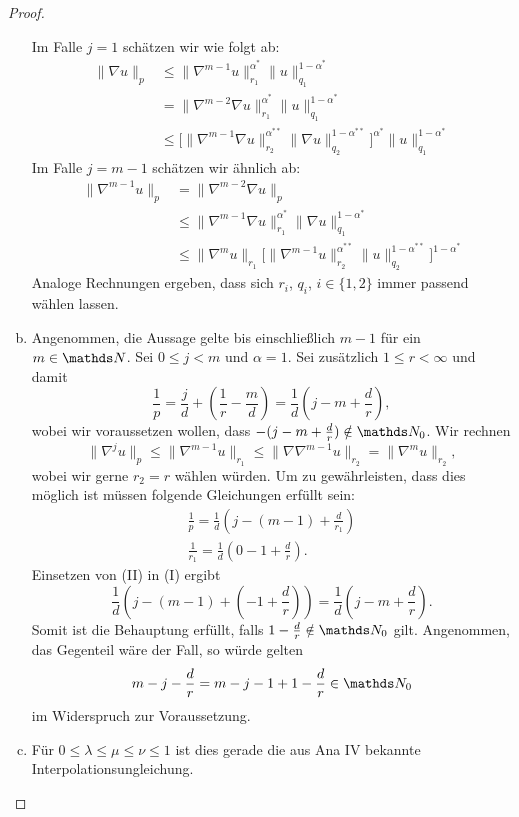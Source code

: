 \begin{proof}
\begin{enumerate}[a)]
      Im Falle $j = 1$ schätzen wir wie folgt ab:
      \begin{align*}
        \| \nabla u\|_p &\leq \|\nabla^{m - 1} u\|_{r_1}^{\alpha^*} \|u\|_{q_1}^{1 - \alpha^*} \\
        &= \|\nabla^{m - 2} \nabla u \|_{r_1}^{\alpha^*} \|u\|_{q_1}^{1 - \alpha^*} \\
        &\leq \Big[ \|\nabla^{m - 1} \nabla u\|_{r_2}^{\alpha^{**}} \|\nabla u\|_{q_2}^{1 - \alpha^{**}} \Big]^{\alpha^*} \|u\|_{q_1}^{1 - \alpha^*}
      \end{align*}
      Im Falle $j = m - 1$ schätzen wir ähnlich ab:
      \begin{align*}
        \| \nabla^{m - 1} u\|_p 
        &= \|\nabla^{m - 2} \nabla u \|_p \\
        &\leq \|\nabla^{m - 1} \nabla u\|_{r_1}^{\alpha^*} \|\nabla u\|_{q_1}^{1 - \alpha^*} \\
        &\leq \|\nabla^{m } u\|_{r_1} \Big[ \|\nabla^{m - 1} u\|_{r_2}^{\alpha^{**}} \|u\|_{q_2}^{1 - \alpha^{**}} \Big]^{1 - \alpha^*}
\end{align*}
Analoge Rechnungen ergeben, dass sich $r_i$, $q_i$, $i \in \{1,2\}$ immer passend wählen lassen.
    \item Angenommen, die Aussage gelte bis einschließlich $m - 1$ für ein $m \in \N$. Sei $0 \leq j < m $ und $\alpha = 1$. 
      Sei zusätzlich $1 \leq r < \infty$ und damit
      $$
      \frac{1}{p} = \frac{j}{d} + (\frac{1}{r} - \frac{m}{d}) = \frac{1}{d} ( j - m + \frac{d}{r}),
      $$
      wobei wir voraussetzen wollen, dass $-(j - m + \frac{d}{r}) \notin \N_0$.
      Wir rechnen
      $$
      \|\nabla^j u\|_p \leq  \|\nabla^{m - 1} u\|_{r_1} \leq \|\nabla \nabla^{m - 1} u\|_{r_2} = \|\nabla^m u\|_{r_2},
      $$
      wobei wir gerne $r_2 = r$ wählen würden.
      Um zu gewährleisten, dass dies möglich ist müssen folgende Gleichungen erfüllt sein:
      \begin{align*}
        \frac{1}{p} = \frac{1}{d}( j - (m - 1) + \frac{d}{r_1} ) \tag{I} \\
        \frac{1}{r_1} = \frac{1}{d} ( 0 - 1 + \frac{d}{r} ) \tag{II}.
      \end{align*}
      Einsetzen von (II) in (I) ergibt
      $$
      \frac{1}{d}( j - (m - 1) + (- 1 + \frac{d}{r})) = \frac{1}{d} (j - m + \frac{d}{r}).
      $$
      Somit ist die Behauptung erfüllt, falls $1 - \frac{d}{r} \notin \N_0$ gilt. Angenommen, das Gegenteil wäre der Fall, so würde gelten
      $$
      m - j - \frac{d}{r} = m - j - 1 + 1 - \frac{d}{r} \in \N_0
      $$
      im Widerspruch zur Voraussetzung.

    \item Für $0 \leq \lambda \leq \mu \leq \nu \leq 1$ ist dies gerade die aus Ana IV bekannte Interpolationsungleichung.
  \end{enumerate}


\end{proof}

